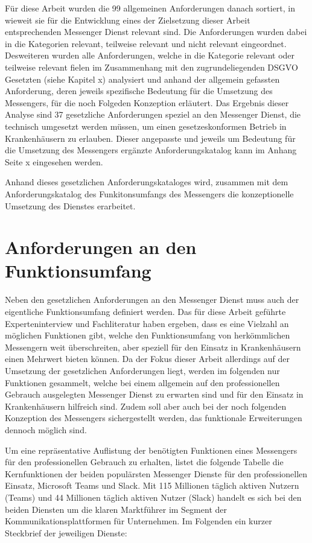 Für diese Arbeit wurden die 99 allgemeinen Anforderungen danach sortiert, in wieweit sie für die Entwicklung eines der Zielsetzung dieser Arbeit entsprechenden Messenger Dienst relevant sind. Die Anforderungen wurden dabei in die Kategorien relevant, teilweise relevant und nicht relevant eingeordnet. Desweiteren wurden alle Anforderungen, welche in die Kategorie relevant oder teilweise relevant fielen im Zusammenhang mit den zugrundeliegenden DSGVO Gesetzten (siehe Kapitel x) analysiert und anhand der allgemein gefassten Anforderung, deren jeweils spezifische Bedeutung für die Umsetzung des Messengers, für die noch Folgeden Konzeption erläutert. Das Ergebnis dieser Analyse sind 37 gesetzliche Anforderungen speziel an den Messenger Dienst, die technisch umgesetzt werden müssen, um einen gesetzeskonformen Betrieb in Krankenhäusern zu erlauben. Dieser angepasste und jeweils um Bedeutung für die Umsetzung des Messengers ergänzte Anforderungskatalog kann im Anhang Seite x eingesehen werden.

Anhand dieses gesetzlichen Anforderungskataloges wird, zusammen mit dem Anforderungskatalog des Funkitonsumfangs des Messengers die konzeptionelle Umsetzung des Dienstes erarbeitet.

\section{Anforderungen an den Funktionsumfang}\label{section:pdimsbd}
Neben den gesetzlichen Anforderungen an den Messenger Dienst muss auch der eigentliche Funktionsumfang definiert werden. Das für diese Arbeit geführte Experteninterview und Fachliteratur haben ergeben, dass es eine Vielzahl an möglichen Funktionen gibt, welche den Funktionsumfang von herkömmlichen Messengern weit überschreiten, aber speziell für den Einsatz in Krankenhäusern einen Mehrwert bieten können.
Da der Fokus dieser Arbeit allerdings auf der Umsetzung der gesetzlichen Anforderungen liegt, werden im folgenden nur Funktionen gesammelt, welche bei einem allgemein auf den professionellen Gebrauch ausgelegten Messenger Dienst zu erwarten sind und für den Einsatz in Krankenhäusern hilfreich sind. Zudem soll aber auch bei der noch folgenden Konzeption des Messengers sichergestellt werden, das funktionale Erweiterungen dennoch möglich sind.

Um eine repräsentative Auflistung der benötigten Funktionen eines Messengers für den professionellen Gebrauch zu erhalten, listet die folgende Tabelle die Kernfunktionen der beiden populärsten Messenger Dienste für den professionellen Einsatz, Microsoft Teams und Slack.
Mit 115 Millionen täglich aktiven Nutzern (Teams) und 44 Millionen täglich aktiven Nutzer (Slack) handelt es sich bei den beiden Diensten um die klaren Marktführer im Segment der Kommunikationsplattformen für Unternehmen. Im Folgenden ein kurzer Steckbrief der jeweiligen Dienste:

